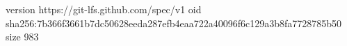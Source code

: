 version https://git-lfs.github.com/spec/v1
oid sha256:7b366f3661b7dc50628eeda287efb4eaa722a40096f6c129a3b8fa7728785b50
size 983

